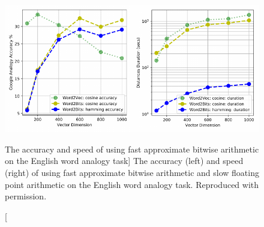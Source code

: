 \begin{figure}
\includegraphics{word2bits-speed}
\vspace{-0.8cm}
\caption
  [The accuracy and speed of using fast approximate bitwise arithmetic
   on the English word analogy task]%
  {The accuracy (left) and speed (right) of using fast approximate
   bitwise arithmetic and slow floating point arithmetic on the English word
   analogy task. Reproduced with permission. \cite[Figure 3.8]{stefanik2019semantic}}
\label{fig:quantized-token-embeddings-with-fast-bitwise-arithmetic}
\end{figure}

